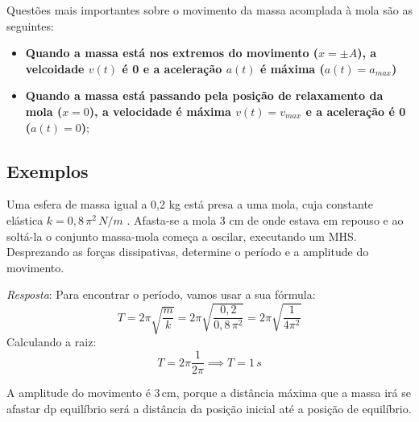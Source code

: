\documentclass[12pt]{extarticle}
\newcommand{\<}{\langle}
\renewcommand{\>}{\rangle}
\theoremstyle{definition}
\begin{document}
Questões mais importantes sobre o movimento da massa acomplada à mola são as seguintes:
\begin{itemize}
    \item \textbf{Quando a massa está nos extremos do movimento ($x= \pm A$), a velcoidade $v(t)$ é 0 e a aceleração $a(t)$ é máxima ($a(t) = a_{max}$)}
    \item \textbf{Quando a massa está passando pela posição de relaxamento da mola ($x=0$), a velocidade é máxima $v(t) = v_{max}$ e a aceleração é 0 ($a(t) =0$)};
\end{itemize}

\subsection{Exemplos}
Uma esfera de massa igual a 0,2 kg está presa a uma mola, cuja constante elástica $k=0,8\,\pi^2\,N/m$ . Afasta-se a mola 3 cm de onde estava em repouso e ao soltá-la o conjunto massa-mola começa a oscilar, executando um MHS. Desprezando as forças dissipativas, determine o período e a amplitude do movimento.

\textit{Resposta}: Para encontrar o período, vamos usar a sua fórmula:
\begin{equation*}
    T = 2\pi\sqrt{\frac{m}{k}} = 2\pi\sqrt{\frac{0,2}{0,8\,\pi^2}} = 2\pi\sqrt{\frac{1}{4\pi^2}}
\end{equation*}
Calculando a raiz:
\begin{equation*}
    T = 2\pi\frac{1}{2\pi} \implies \boxed{T= 1\,s}
\end{equation*}

A amplitude do movimento é 3\,cm, porque a distância máxima que a massa irá se afastar dp equilíbrio será a distância da posição inicial até a posição de equilíbrio.
\end{document}
